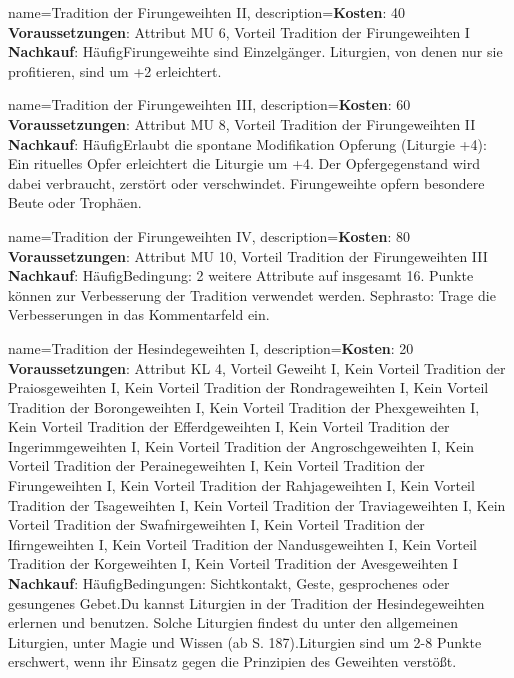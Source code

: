 {
    name={Tradition der Firungeweihten II},
    description={\textbf{Kosten}: 40 \textbf{Voraussetzungen}: Attribut MU 6, Vorteil Tradition der Firungeweihten I \textbf{Nachkauf}: Häufig\newline Firungeweihte sind Einzelgänger. Liturgien, von denen nur sie profitieren, sind um +2 erleichtert.}
}


{
    name={Tradition der Firungeweihten III},
    description={\textbf{Kosten}: 60 \textbf{Voraussetzungen}: Attribut MU 8, Vorteil Tradition der Firungeweihten II \textbf{Nachkauf}: Häufig\newline Erlaubt die spontane Modifikation Opferung (Liturgie +4): Ein rituelles Opfer erleichtert die Liturgie um +4. Der Opfergegenstand wird dabei verbraucht, zerstört oder verschwindet. Firungeweihte opfern besondere Beute oder Trophäen.}
}


{
    name={Tradition der Firungeweihten IV},
    description={\textbf{Kosten}: 80 \textbf{Voraussetzungen}: Attribut MU 10, Vorteil Tradition der Firungeweihten III \textbf{Nachkauf}: Häufig\newline Bedingung: 2 weitere Attribute auf insgesamt 16. Punkte können zur Verbesserung der Tradition verwendet werden. Sephrasto: Trage die Verbesserungen in das Kommentarfeld ein.}
}


{
    name={Tradition der Hesindegeweihten I},
    description={\textbf{Kosten}: 20 \textbf{Voraussetzungen}: Attribut KL 4, Vorteil Geweiht I, Kein Vorteil Tradition der Praiosgeweihten I, Kein Vorteil Tradition der Rondrageweihten I, Kein Vorteil Tradition der Borongeweihten I, Kein Vorteil Tradition der Phexgeweihten I, Kein Vorteil Tradition der Efferdgeweihten I, Kein Vorteil Tradition der Ingerimmgeweihten I, Kein Vorteil Tradition der Angroschgeweihten I, Kein Vorteil Tradition der Perainegeweihten I, Kein Vorteil Tradition der Firungeweihten I, Kein Vorteil Tradition der Rahjageweihten I, Kein Vorteil Tradition der Tsageweihten I, Kein Vorteil Tradition der Traviageweihten I, Kein Vorteil Tradition der Swafnirgeweihten I, Kein Vorteil Tradition der Ifirngeweihten I, Kein Vorteil Tradition der Nandusgeweihten I, Kein Vorteil Tradition der Korgeweihten I, Kein Vorteil Tradition der Avesgeweihten I \textbf{Nachkauf}: Häufig\newline Bedingungen: Sichtkontakt, Geste, gesprochenes oder gesungenes Gebet.\newline Du kannst Liturgien in der Tradition der Hesindegeweihten erlernen und benutzen. Solche Liturgien findest du unter den allgemeinen Liturgien, unter Magie und Wissen (ab S. 187).\newline Liturgien sind um 2-8 Punkte erschwert, wenn ihr Einsatz gegen die Prinzipien des Geweihten verstößt.}
}


